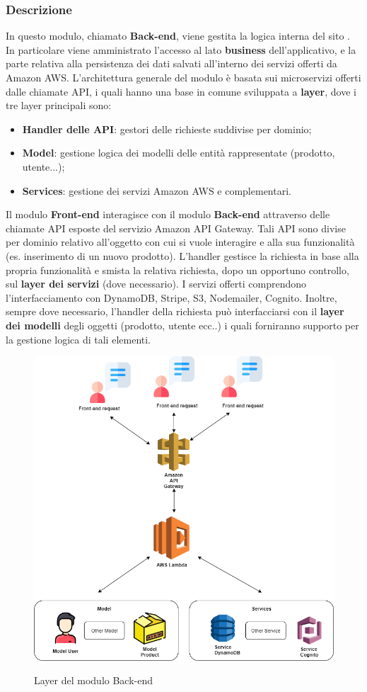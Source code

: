 \subsubsection{Descrizione}
In questo modulo, chiamato \textbf{Back-end}, viene gestita la logica interna del sito \nameproject. In particolare viene amministrato l'accesso al lato \textbf{business} dell'applicativo, e la parte relativa alla persistenza dei dati salvati all'interno dei servizi offerti da Amazon AWS. L'architettura generale del modulo è basata sui microservizi offerti dalle chiamate API, i quali hanno una base in comune sviluppata a \textbf{layer}, dove i tre layer principali sono:
\begin{itemize}
	\item \textbf{Handler delle API}: gestori delle richieste suddivise per dominio;
	\item \textbf{Model}: gestione logica dei modelli delle entità rappresentate (prodotto, utente...);
	\item \textbf{Services}: gestione dei servizi Amazon AWS e complementari.
\end{itemize} Il modulo \textbf{Front-end} interagisce con il modulo \textbf{Back-end} attraverso delle chiamate API esposte del servizio Amazon API Gateway. Tali API sono divise per dominio relativo all'oggetto con cui si vuole interagire e alla sua funzionalità (es. inserimento di un nuovo prodotto). L'handler gestisce la richiesta in base alla propria funzionalità e smista la relativa richiesta, dopo un opportuno controllo, sul \textbf{layer dei servizi} (dove necessario). I servizi offerti comprendono l'interfacciamento con DynamoDB, Stripe, S3, Nodemailer, Cognito. Inoltre, sempre dove necessario, l'handler della richiesta può interfacciarsi con il \textbf{layer dei modelli} degli oggetti (prodotto, utente ecc..) i quali forniranno supporto per la gestione logica di tali elementi.

\vspace{1cm}

\begin{figure}[H]
\centering
\includegraphics[scale=0.40]{res/Architettura/Backend/img/layerBack-end.png}\\
\caption{Layer del modulo Back-end}
\end{figure}